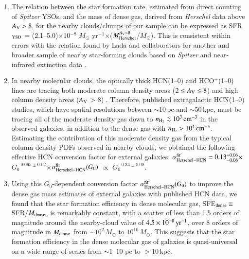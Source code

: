\documentclass{aa}
\def\ltsima{$\; \buildrel < \over \sim \;$}
\def\simlt{\lower.5ex\hbox{\ltsima}}
\begin{document}
{{\begin{enumerate}
\item The relation between the star formation rate, estimated from direct counting of {\it Spitzer} {YSOs}, and the mass of dense gas, derived from {\it Herschel} data above $A_{\rm V} > 8$, for the nearby clouds/clumps of our sample can be expressed as  {SFR$_{\rm YSO}$ =  (2.1--5.0)$\times$10$^{-8}$ $M_{\odot}$ yr$^{-1}$$\times$($M_{\rm Herschel}^{A_{\rm V}>8}$/$M_{\odot}$)}. This is consistent within errors with the relation found by Lada and collaborators for another and broader sample of nearby star-forming clouds based on {\it Spitzer} and near-infrared extinction data \citep[SFR = (4.6$\pm$2.6)$\times$10$^{-8}$ $M_{\odot}$ yr$^{-1}$$\times$($M_{\rm dense}$/$M_{\odot}$),][]{Lada10,Lada12}. 

\item 
In nearby molecular clouds, the optically thick HCN(1--0) and HCO$^+$(1--0) lines are tracing both moderate column density areas ($2 \le A_{\rm V} \le 8$) and high column density areas ($A_{\rm V}$ > 8) \citep[see also][]{Pety16}. Therefore, published extragalactic HCN(1--0) studies, which have spatial resolutions between $\sim 10\,$pc and $\sim 50\,$kpc, must be tracing all of the moderate density gas down to $n_{\rm H_2}  \simlt 10^3\, \rm{cm}^{-3}$ in the observed galaxies, in addition to the dense gas with $n_{\rm H_2}  > 10^4\, \rm{cm}^{-3}$. Estimating the contribution of this moderate density gas from the typical column density PDFs observed in nearby clouds, we obtained the following effective HCN conversion factor for external galaxies:  
$\alpha_{\rm Herschel-HCN}^{\rm fit^\prime} = 0.13^{+0.06}_{-0.06}\times$ $G_{0}^{-0.095\pm0.02}$$\times$$\alpha_{\rm Herschel-HCN}^{\rm fit}(G_0)$ $\propto$ $G_{0}^{-0.34\pm0.08}$.

\item
Using this $G_0$-dependent conversion factor $\alpha_{\rm Herschel-HCN}^{\rm fit^\prime}(G_0)$ to improve the dense gas mass estimates of external galaxies with published HCN data, we found that the star formation efficiency in dense molecular gas, SFE$_{\rm dense} \equiv $ SFR/$M_{\rm dense}$, is remarkably constant, with a scatter of less than 1.5 orders of magnitude around the nearby-cloud value of $4.5 \times 10^{-8}\, {\rm yr}^{-1} $, over 8 orders of magnitude in $M_{\rm dense}$ from $\sim10^2\, M_{\odot}$ to $10^{10}\, M_{\odot}$. This suggests that the star formation efficiency in the dense molecular gas of galaxies is quasi-universal on a wide range of scales from $\sim 1$--10 pc to $> 10\,$kpc.


\end{enumerate}}}
\end{document}
